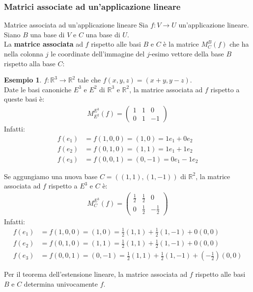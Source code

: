 \documentclass[a4paper]{article}
\theoremstyle{definition}
\newtheorem*{es}{Esempio}
\begin{document}
\subsubsection{Matrici associate ad un'applicazione lineare}
\begin{deff}{Matrice associata ad un'applicazione lineare}{}
	Sia $f: V \rightarrow U$ un'applicazione lineare.
	Siano $B$ una base di $V$ e $C$ una base di $U$. \\
	La \textbf{matrice associata} ad $f$ rispetto alle basi $B$ e $C$ è la matrice $M_C^B(f)$ che ha nella colonna $j$ le coordinate dell'immagine del $j$-esimo vettore della base $B$ rispetto alla base $C$:
\end{deff}
\begin{es}
	$f: \mathbb{R}^3 \rightarrow \mathbb{R}^2$ tale che $f(x, y, z) = (x + y, y - z)$. \\
	Date le basi canoniche $E^3$ e $E^2$ di $\mathbb{R}^3$ e $\mathbb{R}^2$, la matrice associata ad $f$ rispetto a queste basi è:
	\begin{align*}
		M_{E^2}^{E^3}(f) = \begin{pmatrix}
			1 & 1 & 0 \\
			0 & 1 & -1
		\end{pmatrix}
	\end{align*}
	Infatti:
	\begin{align*}
		f(e_1) & = f(1, 0, 0) = (1, 0) = 1e_1 + 0e_2 \\
		f(e_2) & = f(0, 1, 0) = (1, 1) = 1e_1 + 1e_2 \\
		f(e_3) & = f(0, 0, 1) = (0, -1) = 0e_1 - 1e_2
	\end{align*}

	Se aggungiamo una nuova base $C = ((1, 1), (1, -1))$ di $\mathbb{R}^2$, la matrice associata ad $f$ rispetto a $E^3$ e $C$ è:
	\begin{align*}
		M_C^{E^3}(f) = \begin{pmatrix}
			\frac{1}{2} & \frac{1}{2} & 0 \\
			0 & \frac{1}{2} & -\frac{1}{2}
		\end{pmatrix}
	\end{align*}
	Infatti:
	\begin{align*}
		f(e_1) & = f(1, 0, 0) = (1, 0) = \frac{1}{2}(1, 1) + \frac{1}{2}(1, -1) + 0(0, 0) \\
		f(e_2) & = f(0, 1, 0) = (1, 1) = \frac{1}{2}(1, 1) + \frac{1}{2}(1, -1) + 0(0, 0) \\
		f(e_3) & = f(0, 0, 1) = (0, -1) = \frac{1}{2}(1, 1) + \frac{1}{2}(1, -1) + (-\frac{1}{2})(0, 0)
	\end{align*}
\end{es}
Per il teorema dell'estensione lineare, la matrice associata ad $f$ rispetto alle basi $B$ e $C$ determina univocamente $f$.
\end{document}

